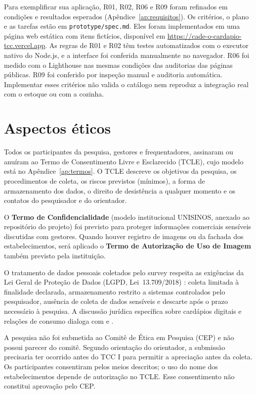 Para exemplificar sua aplicação, R01, R02, R06 e R09 foram refinados em condições e resultados esperados (Apêndice~\ref{ap:requisitos}). Os critérios, o plano e as tarefas estão em \texttt{prototype/\allowbreak spec.md}. Eles foram implementados em uma página web estática com itens fictícios, disponível em \url{https://cade-o-cardapio-tcc.vercel.app}. As regras de R01 e R02 têm testes automatizados com o executor nativo do Node.js, e a interface foi conferida manualmente no navegador. R06 foi medido com o Lighthouse nas mesmas condições das auditorias das páginas públicas. R09 foi conferido por inspeção manual e auditoria automática. Implementar esses critérios não valida o catálogo nem reproduz a integração real com o estoque ou com a cozinha.

\section{Aspectos éticos}
\label{sec:etica}

Todos os participantes da pesquisa, gestores e frequentadores, assinaram ou anuíram ao Termo de Consentimento Livre e Esclarecido (TCLE), cujo modelo está no Apêndice~\ref{ap:termos}. O TCLE descreve os objetivos da pesquisa, os procedimentos de coleta, os riscos previstos (mínimos), a forma de armazenamento dos dados, o direito de desistência a qualquer momento e os contatos do pesquisador e do orientador.

O \textbf{Termo de Confidencialidade} (modelo institucional UNISINOS, anexado ao repositório do projeto) foi previsto para proteger informações comerciais sensíveis discutidas com gestores. Quando houver registro de imagens ou da fachada dos estabelecimentos, será aplicado o \textbf{Termo de Autorização de Uso de Imagem} também previsto pela instituição.

O tratamento de dados pessoais coletados pelo survey respeita as exigências da Lei Geral de Proteção de Dados (LGPD, Lei~13.709/2018) \cite{martins2021principiologia,almeida2022impactos}: coleta limitada à finalidade declarada, armazenamento restrito a sistemas controlados pelo pesquisador, ausência de coleta de dados sensíveis e descarte após o prazo necessário à pesquisa. A discussão jurídica específica sobre cardápios digitais e relações de consumo dialoga com  e .

A pesquisa não foi submetida ao Comitê de Ética em Pesquisa (CEP) e não possui parecer do comitê. Segundo orientação do orientador, a submissão precisaria ter ocorrido antes do TCC I para permitir a apreciação antes da coleta. Os participantes consentiram pelos meios descritos; o uso do nome dos estabelecimentos depende de autorização no TCLE. Esse consentimento não constitui aprovação pelo CEP.
